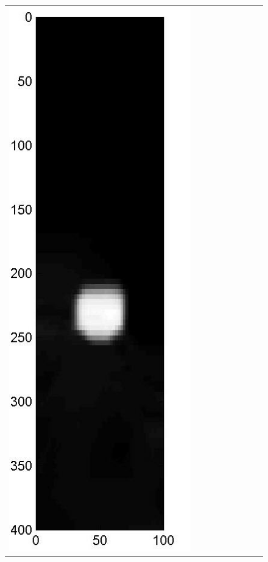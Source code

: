 \documentclass[english]{siamltex}
\begin{document}
{\begin{figure}[!h]
\begin{center}
\begin{tabular}{|c|c|c|c|c|c|c|c|c|}
			\includegraphics[width=.9\iwidth]{figures/newFigs/noisy/resultsExp-5-mkTV}
			&

\end{tabular}
\end{center}
\end{figure}}
\end{document}
